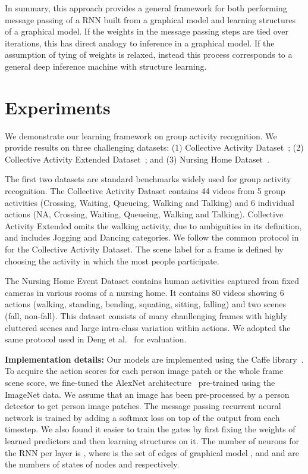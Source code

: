\documentclass[10pt,twocolumn,letterpaper]{article}
\begin{document}
In summary, this approach provides a general framework for both performing message passing of a RNN built from a graphical model and learning structures of a graphical model.  If the weights in the message passing steps are tied over iterations, this has direct analogy to inference in a graphical model.  If the assumption of tying of weights is relaxed, instead this process corresponds to a general deep inference machine with structure learning.



\section{Experiments}


We demonstrate our learning framework on group activity recognition. We provide results on three challenging datasets: (1) Collective Activity Dataset~\cite{Choi_VSWS_2009}; (2) Collective Activity Extended Dataset~\cite{Choi_CVPR_2011}; and (3) Nursing Home Dataset~\cite{DengZCLMRM15}.

The first two datasets are standard benchmarks widely used for group activity recognition. The Collective Activity Dataset contains 44 videos from 5 group activities (Crossing, Waiting, Queueing, Walking and Talking) and 6 individual actions (NA, Crossing, Waiting, Queueing, Walking and Talking). Collective Activity Extended omits the walking activity, due to ambiguities in its definition, and includes Jogging and Dancing categories. We follow the common protocol in \cite{LanWYRM12} for the Collective Activity Dataset. The scene label for a frame is defined by choosing the activity in which the most people participate. 

The Nursing Home Event Dataset contains human activities captured from fixed cameras in various rooms of a nursing home. It contains 80 videos showing 6 actions (walking, standing, bending, squating, sitting, falling) and two scenes (fall, non-fall). This dataset consists of many chanllenging frames with highly cluttered scenes and large intra-class variation within actions. We adopted the same protocol used in Deng et al.~\cite{DengZCLMRM15} for evaluation.

\textbf{Implementation details: } Our models are implemented using the Caffe library~\cite{jia2014caffe}. To acquire the action scores for each person image patch or the whole frame scene score, we fine-tuned the AlexNet architecture~\cite{KrizhevskySH12} pre-trained using the ImageNet data. We assume that an image has been pre-processed by a person detector to get person image patches. The message passing recurrent neural network is trained by adding a softmax loss on top of the output from each timestep. We also found it easier to train the gates by first fixing the weights of learned predictors and then learning structures on it. The number of neurons for the RNN per layer is , where  is the set of edges of graphical model , and  and  are the numbers of states of nodes  and  respectively.
\end{document}
